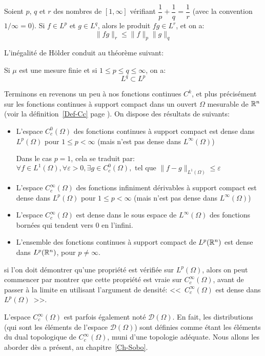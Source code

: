 \begin{theoreme}
Soient $p$, $q$ et $r$ des nombres de $[1,\infty]$ vérifiant
$\dfrac1p+\dfrac1q=\dfrac1r$ (avec la convention $1/\infty=0$).
Si $f\in L^p$ et $g\in L^q$, alors le produit $fg\in L^r$, et on a:
\begin{equation}\|fg\|_r\le\|f\|_p\|g\|_q\end{equation}
\end{theoreme}

L'inégalité de Hölder conduit au théorème suivant:
\begin{theoreme}
Si $\mu$ est une mesure finie et si $1\le p\le q\le \infty$, on a:
\begin{equation}L^q\subset L^p\end{equation}
\end{theoreme}

\medskip
Terminons en revenons un peu à nos fonctions continues $C^k$, et plus précisément sur les fonctions continues à support compact
dans un ouvert $\Omega$ mesurable de $\mathbb R^n$ (voir la définition~\ref{Def-Cc} page \pageref{Def-Cc}).
On dispose des résultats de  suivants:
\begin{itemize}
   \item L'espace $C_c^0(\Omega)$ des fonctions continues à support compact est dense dans $L^p(\Omega)$ pour $1\le p<\infty$
	(mais n'est pas dense dans $L^\infty(\Omega)$)

	 Dans le cas $p=1$, cela se traduit par: 	$  \forall f\in L^1(\Omega), \forall\varepsilon>0, \exists g\in C_ c^0(\Omega), \text{ tel que }
	   \|f-g\|_{L^1(\Omega)}\le\varepsilon$ 

   \item L'espace $C_c^\infty(\Omega)$ des fonctions infiniment dérivables à support compact est dense dans $L^p(\Omega)$ pour $1\le p<\infty$
	(mais n'est pas dense dans $L^\infty(\Omega)$)
   \item L'espace $C_c^\infty(\Omega)$ est dense dans le sous espace de $L^\infty(\Omega)$ des fonctions bornées qui tendent vers 0 en l'infini.
   \item L'ensemble des fonctions continues à support compact de $L^p(\mathbb R^n)$ est dense dans $L^p(\mathbb R^n)$, pour $ p\neq \infty$. 
\end{itemize}

si l'on doit démontrer qu'une propriété est vérifiée sur $L^p(\Omega)$, alors on peut commencer par montrer que cette propriété est 
vraie sur $C_c^\infty(\Omega)$, avant de passer à la limite en utilisant  l'argument de densité:
<<~$C_c^\infty(\Omega)$ est dense dans $L^p(\Omega)$~>>.

\medskip
L'espace $C_c^{\infty}(\Omega)$ est parfois également noté $\mathcal{D}(\Omega)$. 
En fait, les distributions (qui sont les éléments de l'espace $\mathcal{D}(\Omega)$) sont définies comme étant les éléments du 
dual topologique de $C_c^{\infty}(\Omega)$, muni d'une topologie adéquate.
Nous allons les aborder dès a présent, au chapitre~\ref{Ch-Sobo}.
